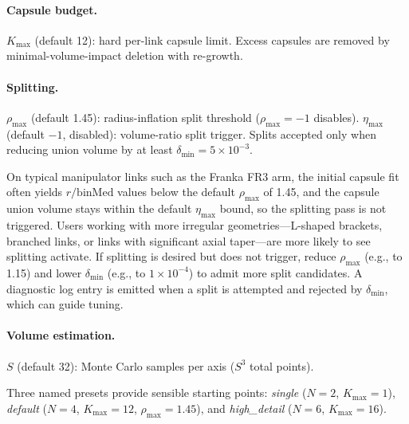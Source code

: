 \paragraph{Capsule budget.}
$K_{\max}$ (default 12): hard per-link capsule limit. Excess capsules are removed by minimal-volume-impact deletion with re-growth.

\paragraph{Splitting.}
$\rho_{\max}$ (default 1.45): radius-inflation split threshold ($\rho_{\max} = -1$ disables). $\eta_{\max}$ (default $-1$, disabled): volume-ratio split trigger. Splits accepted only when reducing union volume by at least $\delta_{\min} = 5 \times 10^{-3}$.

On typical manipulator links such as the Franka FR3 arm, the initial capsule fit often yields $r/\mathrm{binMed}$ values below the default $\rho_{\max}$ of 1.45, and the capsule union volume stays within the default $\eta_{\max}$ bound, so the splitting pass is not triggered. Users working with more irregular geometries---L-shaped brackets, branched links, or links with significant axial taper---are more likely to see splitting activate. If splitting is desired but does not trigger, reduce $\rho_{\max}$ (e.g., to 1.15) and lower $\delta_{\min}$ (e.g., to $1\times 10^{-4}$) to admit more split candidates. A diagnostic log entry is emitted when a split is attempted and rejected by $\delta_{\min}$, which can guide tuning.

\paragraph{Volume estimation.}
$S$ (default 32): Monte Carlo samples per axis ($S^3$ total points).

Three named presets provide sensible starting points: \emph{single} ($N = 2$, $K_{\max} = 1$), \emph{default} ($N = 4$, $K_{\max} = 12$, $\rho_{\max} = 1.45$), and \emph{high\_detail} ($N = 6$, $K_{\max} = 16$).
